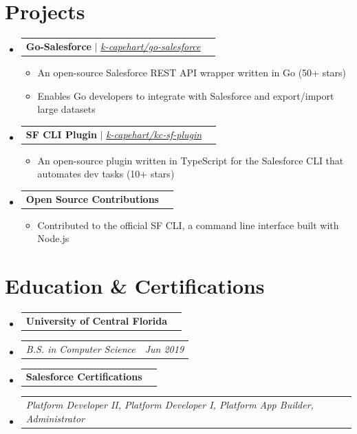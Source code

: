\documentclass[letterpaper,11pt]{article}
\makeatletter
\newcommand{\resumeItem}[1]{
  \item\small{
    {#1 \vspace{-2pt}}
  }
}
\newcommand{\resumeSubheading}[2]{
  \vspace{-2pt}\item
    \begin{tabular*}{0.97\textwidth}[t]{l@{\extracolsep{\fill}}r}
      \textbf{\small#1} & \textit{\small #2} \\
    \end{tabular*}\vspace{-7pt}
}
\newcommand{\resumeSubSubheading}[2]{
    \item
    \begin{tabular*}{0.97\textwidth}{l@{\extracolsep{\fill}}r}
      \textit{\small#1} & \textit{\small #2} \\
    \end{tabular*}\vspace{-7pt}
}
\newcommand{\resumeProjectHeading}[2]{
    \vspace{-2pt}\item
    \begin{tabular*}{0.97\textwidth}{l@{\extracolsep{\fill}}r}
      \small#1 & #2 \\
    \end{tabular*}\vspace{-7pt}
}
\newcommand{\resumeSubHeadingListStart}{\begin{itemize}[leftmargin=0.15in, label={}]}
\newcommand{\resumeSubHeadingListEnd}{\end{itemize}}
\newcommand{\resumeItemListStart}{\begin{itemize}}
\newcommand{\resumeItemListEnd}{\end{itemize}\vspace{-5pt}}
\makeatother
\begin{document}

\section{Projects}
    \vspace{3pt}
    \resumeSubHeadingListStart
      
      \resumeProjectHeading
        {\textbf{Go-Salesforce} $|$ \emph{\href{https://github.com/k-capehart/go-salesforce}{\color{blue}k-capehart/go-salesforce}}}{}
          \resumeItemListStart
            \resumeItem{An open-source Salesforce REST API wrapper written in Go (50+ stars)}
            \resumeItem{Enables Go developers to integrate with Salesforce and export/import large datasets}
          \resumeItemListEnd
      
      \resumeProjectHeading
        {\textbf{SF CLI Plugin} $|$ \emph{\href{https://github.com/k-capehart/kc-sf-plugin}{\color{blue}k-capehart/kc-sf-plugin}}}{}
          \resumeItemListStart
            \resumeItem{An open-source plugin written in TypeScript for the Salesforce CLI that automates dev tasks (10+ stars)}
          \resumeItemListEnd
      
      \resumeProjectHeading
        {\textbf{Open Source Contributions}}{}
          \resumeItemListStart
            \resumeItem{Contributed to the official SF CLI, a command line interface built with Node.js}
          \resumeItemListEnd
      
    \resumeSubHeadingListEnd



\section{Education \& Certifications}
  \vspace{3pt}
  \resumeSubHeadingListStart

    \resumeSubheading
      {University of Central Florida}{}
      \resumeSubSubheading{B.S. in Computer Science}{Jun 2019}
    \vspace{7pt}

    \resumeSubheading
      {Salesforce Certifications}{}
        \resumeSubSubheading{Platform Developer II, Platform Developer I, Platform App Builder, Administrator}{}

  \resumeSubHeadingListEnd
\end{document}
